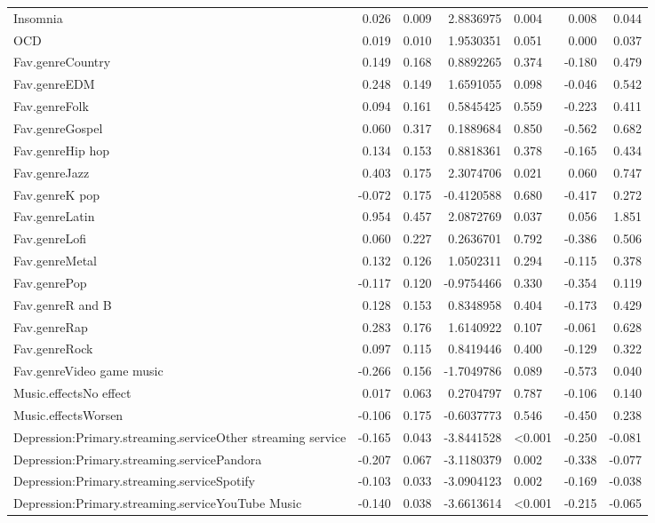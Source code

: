 \documentclass[
  letterpaper,
  DIV=11,
  numbers=noendperiod]{scrartcl}
\begin{document}
\begin{longtable}[t]{lrrrlrr}
Insomnia & 0.026 & 0.009 & 2.8836975 & 0.004 & 0.008 & 0.044\\
OCD & 0.019 & 0.010 & 1.9530351 & 0.051 & 0.000 & 0.037\\
\addlinespace
Fav.genreCountry & 0.149 & 0.168 & 0.8892265 & 0.374 & -0.180 & 0.479\\
Fav.genreEDM & 0.248 & 0.149 & 1.6591055 & 0.098 & -0.046 & 0.542\\
Fav.genreFolk & 0.094 & 0.161 & 0.5845425 & 0.559 & -0.223 & 0.411\\
Fav.genreGospel & 0.060 & 0.317 & 0.1889684 & 0.850 & -0.562 & 0.682\\
Fav.genreHip hop & 0.134 & 0.153 & 0.8818361 & 0.378 & -0.165 & 0.434\\
\addlinespace
Fav.genreJazz & 0.403 & 0.175 & 2.3074706 & 0.021 & 0.060 & 0.747\\
Fav.genreK pop & -0.072 & 0.175 & -0.4120588 & 0.680 & -0.417 & 0.272\\
Fav.genreLatin & 0.954 & 0.457 & 2.0872769 & 0.037 & 0.056 & 1.851\\
Fav.genreLofi & 0.060 & 0.227 & 0.2636701 & 0.792 & -0.386 & 0.506\\
Fav.genreMetal & 0.132 & 0.126 & 1.0502311 & 0.294 & -0.115 & 0.378\\
\addlinespace
Fav.genrePop & -0.117 & 0.120 & -0.9754466 & 0.330 & -0.354 & 0.119\\
Fav.genreR and B & 0.128 & 0.153 & 0.8348958 & 0.404 & -0.173 & 0.429\\
Fav.genreRap & 0.283 & 0.176 & 1.6140922 & 0.107 & -0.061 & 0.628\\
Fav.genreRock & 0.097 & 0.115 & 0.8419446 & 0.400 & -0.129 & 0.322\\
Fav.genreVideo game music & -0.266 & 0.156 & -1.7049786 & 0.089 & -0.573 & 0.040\\
\addlinespace
Music.effectsNo effect & 0.017 & 0.063 & 0.2704797 & 0.787 & -0.106 & 0.140\\
Music.effectsWorsen & -0.106 & 0.175 & -0.6037773 & 0.546 & -0.450 & 0.238\\
Depression:Primary.streaming.serviceOther streaming service & -0.165 & 0.043 & -3.8441528 & <0.001 & -0.250 & -0.081\\
Depression:Primary.streaming.servicePandora & -0.207 & 0.067 & -3.1180379 & 0.002 & -0.338 & -0.077\\
Depression:Primary.streaming.serviceSpotify & -0.103 & 0.033 & -3.0904123 & 0.002 & -0.169 & -0.038\\
\addlinespace
Depression:Primary.streaming.serviceYouTube Music & -0.140 & 0.038 & -3.6613614 & <0.001 & -0.215 & -0.065\\
\bottomrule
\end{longtable}
\end{document}
